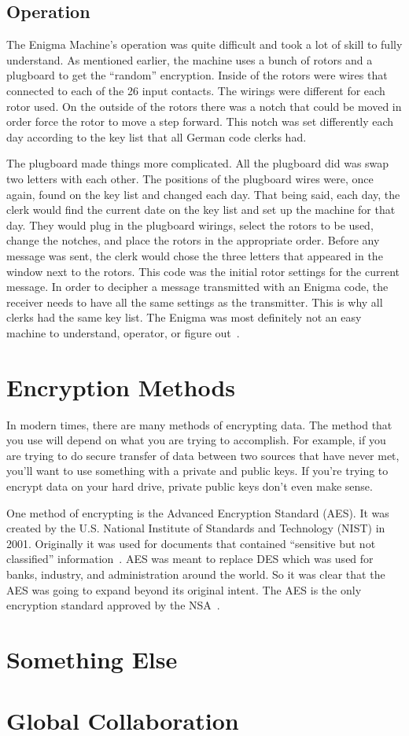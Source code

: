 \documentclass[12pt,a4paper,titlepage]{article}
\begin{document}
\subsection{Operation}
The Enigma Machine's operation was quite difficult and took a lot of skill to
fully understand. As mentioned earlier, the machine uses a bunch of rotors and a
plugboard to get the ``random'' encryption. Inside of the rotors were wires that
connected to each of the 26 input contacts. The wirings were different for each
rotor used. On the outside of the rotors there was a notch that could be moved
in order force the rotor to move a step forward. This notch was set differently
each day according to the key list that all German code clerks had.

The plugboard made things more complicated. All the plugboard did was swap two
letters with each other. The positions of the plugboard wires were, once again,
found on the key list and changed each day. That being said, each day, the
clerk would find the current date on the key list and set up the machine for
that day. They would plug in the plugboard wirings, select the rotors to be
used, change the notches, and place the rotors in the appropriate order. Before
any message was sent, the clerk would chose the three letters that appeared
in the window next to the rotors. This code was the initial rotor settings for
the current message. In order to decipher a message transmitted with an Enigma
code, the receiver needs to have all the same settings as the transmitter. This
is why all clerks had the same key list. The Enigma was most definitely not an
easy machine to understand, operator, or figure out~\cite{wilcox2006solving}.

\section{Encryption Methods}
In modern times, there are many methods of encrypting data. The method that you
use will depend on what you are trying to accomplish. For example, if you are 
trying to do secure transfer of data between two sources that have never met, 
you'll want to use something with a private and public keys. If you're trying 
to encrypt data on your hard drive, private public keys don't even make sense. 

One method of encrypting is the Advanced Encryption Standard (AES)\@. It was 
created by the U.S. National Institute of Standards and Technology (NIST) in 
2001. Originally it was used for documents that contained ``sensitive but not 
classified'' information~\cite{daemen2013design}. AES was meant to replace DES 
which was used for banks, industry, and administration around the world. So it 
was clear that the AES was going to expand beyond its original intent. The AES 
is the only encryption standard approved by the NSA~\cite{daemen2013design}.

\section{Something Else}

\section{Global Collaboration}
\label{sec:global_collaboration}



\newpage

\appendix

\newpage
\printbibliography
\end{document}

